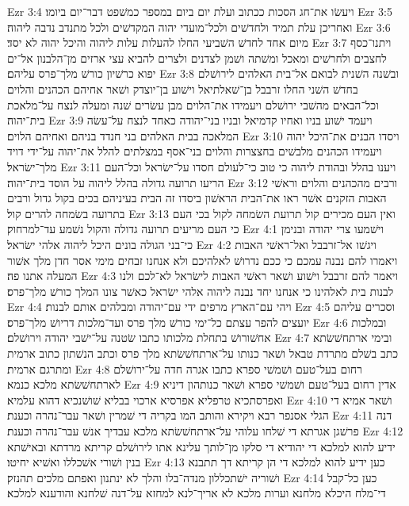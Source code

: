 Ezr 3:4  ויעשׂו את־חג הסכות ככתוב ועלת יום ביום במספר כמשׁפט דבר־יום ביומו׃
Ezr 3:5  ואחריכן עלת תמיד ולחדשׁים ולכל־מועדי יהוה המקדשׁים ולכל מתנדב נדבה ליהוה׃
Ezr 3:6  מיום אחד לחדשׁ השׁביעי החלו להעלות עלות ליהוה והיכל יהוה לא יסד׃
Ezr 3:7  ויתנו־כסף לחצבים ולחרשׁים ומאכל ומשׁתה ושׁמן לצדנים ולצרים להביא עצי ארזים מן־הלבנון אל־ים יפוא כרשׁיון כורשׁ מלך־פרס עליהם׃
Ezr 3:8  ובשׁנה השׁנית לבואם אל־בית האלהים לירושׁלם בחדשׁ השׁני החלו זרבבל בן־שׁאלתיאל וישׁוע בן־יוצדק ושׁאר אחיהם הכהנים והלוים וכל־הבאים מהשׁבי ירושׁלם ויעמידו את־הלוים מבן עשׂרים שׁנה ומעלה לנצח על־מלאכת בית־יהוה׃
Ezr 3:9  ויעמד ישׁוע בניו ואחיו קדמיאל ובניו בני־יהודה כאחד לנצח על־עשׂה המלאכה בבית האלהים בני חנדד בניהם ואחיהם הלוים׃
Ezr 3:10  ויסדו הבנים את־היכל יהוה ויעמידו הכהנים מלבשׁים בחצצרות והלוים בני־אסף במצלתים להלל את־יהוה על־ידי דויד מלך־ישׂראל׃
Ezr 3:11  ויענו בהלל ובהודת ליהוה כי טוב כי־לעולם חסדו על־ישׂראל וכל־העם הריעו תרועה גדולה בהלל ליהוה על הוסד בית־יהוה׃
Ezr 3:12  ורבים מהכהנים והלוים וראשׁי האבות הזקנים אשׁר ראו את־הבית הראשׁון ביסדו זה הבית בעיניהם בכים בקול גדול ורבים בתרועה בשׂמחה להרים קול׃
Ezr 3:13  ואין העם מכירים קול תרועת השׂמחה לקול בכי העם כי העם מריעים תרועה גדולה והקול נשׁמע עד־למרחוק׃
Ezr 4:1  וישׁמעו צרי יהודה ובנימן כי־בני הגולה בונים היכל ליהוה אלהי ישׂראל׃
Ezr 4:2  ויגשׁו אל־זרבבל ואל־ראשׁי האבות ויאמרו להם נבנה עמכם כי ככם נדרושׁ לאלהיכם ולא אנחנו זבחים מימי אסר חדן מלך אשׁור המעלה אתנו פה׃
Ezr 4:3  ויאמר להם זרבבל וישׁוע ושׁאר ראשׁי האבות לישׂראל לא־לכם ולנו לבנות בית לאלהינו כי אנחנו יחד נבנה ליהוה אלהי ישׂראל כאשׁר צונו המלך כורשׁ מלך־פרס׃
Ezr 4:4  ויהי עם־הארץ מרפים ידי עם־יהודה ומבלהים אותם לבנות׃
Ezr 4:5  וסכרים עליהם יועצים להפר עצתם כל־ימי כורשׁ מלך פרס ועד־מלכות דריושׁ מלך־פרס׃
Ezr 4:6  ובמלכות אחשׁורושׁ בתחלת מלכותו כתבו שׂטנה על־ישׁבי יהודה וירושׁלם׃
Ezr 4:7  ובימי ארתחשׁשׂתא כתב בשׁלם מתרדת טבאל ושׁאר כנותו על־ארתחשׁשׂתא מלך פרס וכתב הנשׁתון כתוב ארמית ומתרגם ארמית׃
Ezr 4:8  רחום בעל־טעם ושׁמשׁי ספרא כתבו אגרה חדה על־ירושׁלם לארתחשׁשׂתא מלכא כנמא׃
Ezr 4:9  אדין רחום בעל־טעם ושׁמשׁי ספרא ושׁאר כנותהון דיניא ואפרסתכיא טרפליא אפרסיא ארכוי בבליא שׁושׁנכיא דהוא עלמיא׃
Ezr 4:10  ושׁאר אמיא די הגלי אסנפר רבא ויקירא והותב המו בקריה די שׁמרין ושׁאר עבר־נהרה וכענת׃
Ezr 4:11  דנה פרשׁגן אגרתא די שׁלחו עלוהי על־ארתחשׁשׂתא מלכא עבדיך אנשׁ עבר־נהרה וכענת׃
Ezr 4:12  ידיע להוא למלכא די יהודיא די סלקו מן־לותך עלינא אתו לירושׁלם קריתא מרדתא ובאישׁתא בנין ושׁורי אשׁכללו ואשׁיא יחיטו׃
Ezr 4:13  כען ידיע להוא למלכא די הן קריתא דך תתבנא ושׁוריה ישׁתכללון מנדה־בלו והלך לא ינתנון ואפתם מלכים תהנזק׃
Ezr 4:14  כען כל־קבל די־מלח היכלא מלחנא וערות מלכא לא אריך־לנא למחזא על־דנה שׁלחנא והודענא למלכא׃
